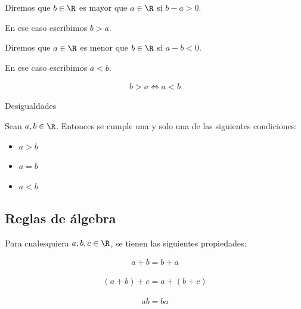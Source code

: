 
 Diremos que $b\in \R$ es mayor que $a\in\R$ si $b-a>0$. 
  
 
 En ese caso escribimos $b>a$.

{}
	Diremos que $a\in \R$ es menor que  $b\in\R$ si $a-b<0$.
	
	En ese caso escribimos $a<b$.

{}
	\begin{proposicion}
		\begin{align*}
		b>a \iff a<b	
		\end{align*}
	\end{proposicion}

{Desigualdades}
	\begin{proposicion}
		Sean $a,b\in\R$. Entonces se cumple una y solo una de las siguientes condiciones:
		\begin{itemize}
			\item $a>b$
			\item $a=b$
			\item $a<b$
		\end{itemize}
	\end{proposicion}

\subsection{Reglas de álgebra}

	Para cualesquiera $a,b,c\in\R$, se tienen las siguientes propiedades:

{}
	\begin{axioma}
		\label{axiom--1}
		\begin{align*}
		a+b=b+a
		\end{align*}
	\end{axioma}

{}
	\begin{axioma}
		\label{axiom--2}
		\begin{align*}
	(a+b)+c = a+(b+c)
		\end{align*}
	\end{axioma}

{}
	\begin{axioma}
		\label{axiom--3}
		\begin{align*}
		ab=ba
		\end{align*}
	\end{axioma}

